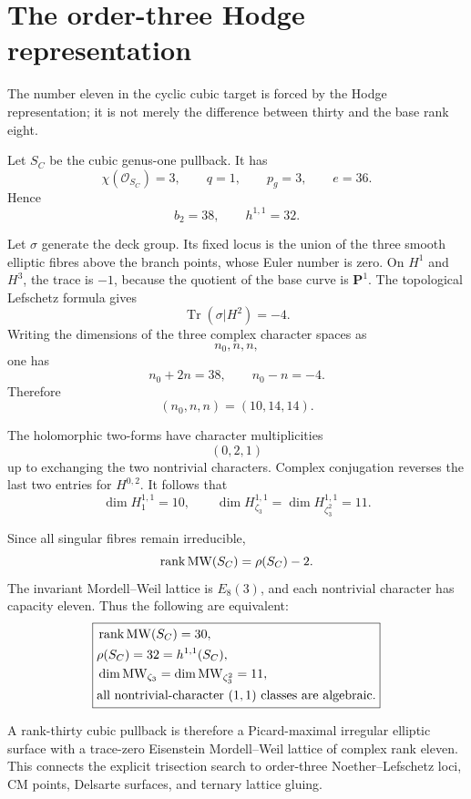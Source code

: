 \section{The order-three Hodge representation}

The number eleven in the cyclic cubic target is forced by the Hodge
representation; it is not merely the difference between thirty and the base
rank eight.

Let $S_C$ be the cubic genus-one pullback.  It has
\[
\chi(\mathcal O_{S_C})=3,
\qquad
q=1,
\qquad
p_g=3,
\qquad
e=36.
\]
Hence
\[
\boxed{b_2=38,\qquad h^{1,1}=32.}
\]

Let $\sigma$ generate the deck group.  Its fixed locus is the union of the
three smooth elliptic fibres above the branch points, whose Euler number is
zero.  On $H^1$ and $H^3$, the trace is $-1$, because the quotient of the
base curve is $\mathbf P^1$.  The topological Lefschetz formula gives
\[
\operatorname{Tr}(\sigma|H^2)=-4.
\]
Writing the dimensions of the three complex character spaces as
\[
n_0,n,n,
\]
one has
\[
n_0+2n=38,
\qquad
n_0-n=-4.
\]
Therefore
\[
\boxed{(n_0,n,n)=(10,14,14).}
\]

The holomorphic two-forms have character multiplicities
\[
(0,2,1)
\]
up to exchanging the two nontrivial characters.  Complex conjugation reverses
the last two entries for $H^{0,2}$.  It follows that
\[
\boxed{
\dim H^{1,1}_1=10,
\qquad
\dim H^{1,1}_{\zeta_3}
=
\dim H^{1,1}_{\zeta_3^2}=11.
}
\]

Since all singular fibres remain irreducible,
\[
\operatorname{rank}\operatorname{MW}(S_C)=\rho(S_C)-2.
\]
The invariant Mordell--Weil lattice is $E_8(3)$, and each nontrivial character
has capacity eleven.  Thus the following are equivalent:
\[
\boxed{
\begin{aligned}
&\operatorname{rank}\operatorname{MW}(S_C)=30,\\
&\rho(S_C)=32=h^{1,1}(S_C),\\
&\dim\operatorname{MW}_{\zeta_3}=\dim\operatorname{MW}_{\zeta_3^2}=11,\\
&\text{all nontrivial-character }(1,1)\text{ classes are algebraic.}
\end{aligned}
}
\]

A rank-thirty cubic pullback is therefore a Picard-maximal irregular elliptic
surface with a trace-zero Eisenstein Mordell--Weil lattice of complex rank
eleven.  This connects the explicit trisection search to order-three
Noether--Lefschetz loci, CM points, Delsarte surfaces, and ternary lattice
gluing.
